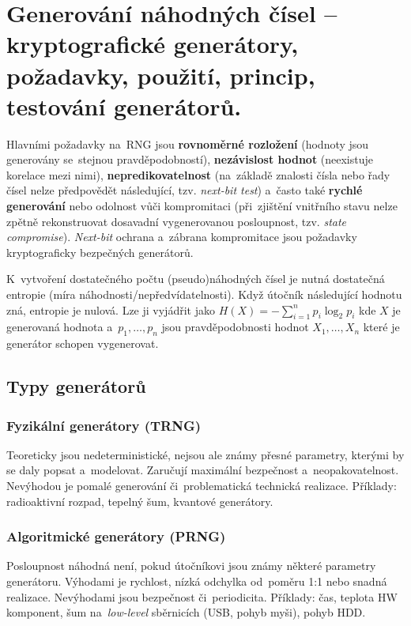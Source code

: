 \clearpage
\section{Generování náhodných čísel -- kryptografické generátory, požadavky, použití, princip, testování generátorů.}

Hlavními požadavky na~RNG jsou \textbf{rovnoměrné rozložení} (hodnoty jsou generovány se~stejnou pravděpodobností), \textbf{nezávislost hodnot} (neexistuje korelace mezi nimi), \textbf{nepredikovatelnost} (na~základě znalosti čísla nebo řady čísel nelze předpovědět následující, tzv. \emph{next-bit test}) a~často také \textbf{rychlé generování} nebo odolnost vůči kompromitaci (při~zjištění vnitřního stavu nelze zpětně rekonstruovat dosavadní vygenerovanou posloupnost, tzv. \emph{state compromise}). \emph{Next-bit} ochrana a~zábrana kompromitace jsou požadavky kryptograficky bezpečných generátorů.

K~vytvoření dostatečného počtu (pseudo)náhodných čísel je nutná dostatečná entropie (míra náhodnosti/nepředvídatelnosti). Když útočník následující hodnotu zná, entropie je nulová. Lze ji vyjádřit jako $H(X) = - \sum_{i=1}^{n} p_i \log_2 p_i$ kde $X$ je generovaná hodnota a~$p_1, \dots, p_n$ jsou pravděpodobnosti hodnot $X_1, \dots, X_n$ které je generátor schopen vygenerovat.

\subsection{Typy generátorů}

\subsubsection*{Fyzikální generátory (TRNG)}

Teoreticky jsou nedeterministické, nejsou ale známy přesné parametry, kterými by se daly popsat a~modelovat. Zaručují maximální bezpečnost a~neopakovatelnost. Nevýhodou je pomalé generování či~problematická technická realizace. Příklady: radioaktivní rozpad, tepelný šum, kvantové generátory.

\subsubsection*{Algoritmické generátory (PRNG)}

Posloupnost náhodná není, pokud útočníkovi jsou známy některé parametry generátoru. Výhodami je rychlost, nízká odchylka od~poměru 1:1 nebo snadná realizace. Nevýhodami jsou bezpečnost či~periodicita. Příklady: čas, teplota HW komponent, šum na~\emph{low-level} sběrnicích (USB, pohyb myši), pohyb HDD.

